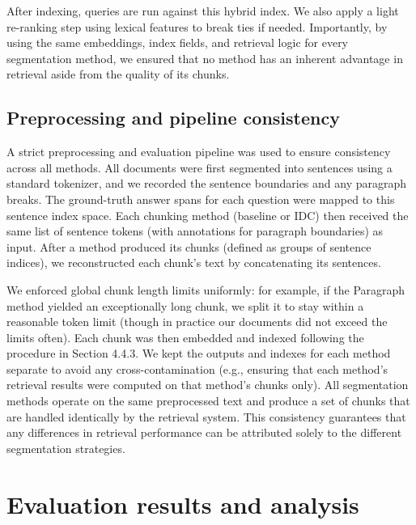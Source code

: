 \documentclass[12pt,a4paper]{report}
\begin{document}
After indexing, queries are run against this hybrid index. We also apply a light re-ranking step using lexical features to break ties if needed. Importantly, by using the same embeddings, index fields, and retrieval logic for every segmentation method, we ensured that no method has an inherent advantage in retrieval aside from the quality of its chunks.

\subsection{Preprocessing and pipeline consistency}

A strict preprocessing and evaluation pipeline was used to ensure consistency across all methods. All documents were first segmented into sentences using a standard tokenizer, and we recorded the sentence boundaries and any paragraph breaks. The ground-truth answer spans for each question were mapped to this sentence index space. Each chunking method (baseline or IDC) then received the same list of sentence tokens (with annotations for paragraph boundaries) as input. After a method produced its chunks (defined as groups of sentence indices), we reconstructed each chunk's text by concatenating its sentences. 

We enforced global chunk length limits uniformly: for example, if the Paragraph method yielded an exceptionally long chunk, we split it to stay within a reasonable token limit (though in practice our documents did not exceed the limits often). Each chunk was then embedded and indexed following the procedure in Section 4.4.3. We kept the outputs and indexes for each method separate to avoid any cross-contamination (e.g., ensuring that each method's retrieval results were computed on that method's chunks only). All segmentation methods operate on the same preprocessed text and produce a set of chunks that are handled identically by the retrieval system. This consistency guarantees that any differences in retrieval performance can be attributed solely to the different segmentation strategies.

\section{Evaluation results and analysis}
\end{document}
